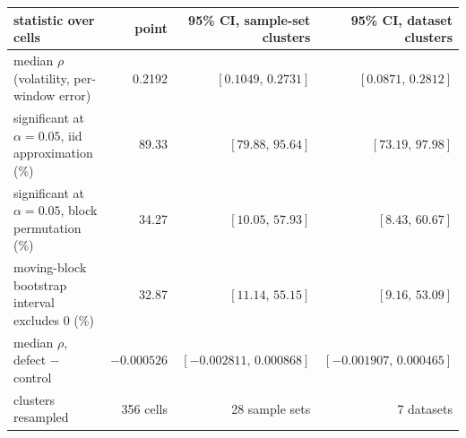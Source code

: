 \small
\begin{tabular}{lrrr}
\toprule
statistic over cells & point & 95\% CI, sample-set clusters & 95\% CI, dataset clusters \\
\midrule
median $\rho$(volatility, per-window error) & 0.2192 & $[0.1049,\,0.2731]$ & $[0.0871,\,0.2812]$ \\
significant at $\alpha=0.05$, iid approximation (\%) & 89.33 & $[79.88,\,95.64]$ & $[73.19,\,97.98]$ \\
significant at $\alpha=0.05$, block permutation (\%) & 34.27 & $[10.05,\,57.93]$ & $[8.43,\,60.67]$ \\
moving-block bootstrap interval excludes $0$ (\%) & 32.87 & $[11.14,\,55.15]$ & $[9.16,\,53.09]$ \\
median $\rho$, defect $-$ control & $-0.000526$ & $[-0.002811,\,0.000868]$ & $[-0.001907,\,0.000465]$ \\
clusters resampled & 356 cells & 28 sample sets & 7 datasets \\
\bottomrule
\end{tabular}
